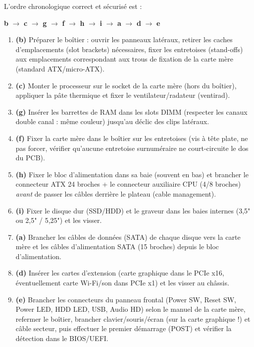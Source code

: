 \documentclass[11pt]{article}
\begin{document}
\begin{corrige}
L'ordre chronologique correct et sécurisé est :
\begin{center}
\textbf{b} $\rightarrow$ \textbf{c} $\rightarrow$ \textbf{g} $\rightarrow$ \textbf{f} $\rightarrow$ \textbf{h} $\rightarrow$ \textbf{i} $\rightarrow$ \textbf{a} $\rightarrow$ \textbf{d} $\rightarrow$ \textbf{e}
\end{center}
\begin{enumerate}
  \item \textbf{(b)} Préparer le boîtier : ouvrir les panneaux latéraux, retirer les caches d'emplacements (slot brackets) nécessaires, fixer les entretoises (stand-offs) aux emplacements correspondant aux trous de fixation de la carte mère (standard ATX/micro-ATX).
  \item \textbf{(c)} Monter le processeur sur le socket de la carte mère (hors du boîtier), appliquer la pâte thermique et fixer le ventilateur/radateur (ventirad).
  \item \textbf{(g)} Insérer les barrettes de RAM dans les slots DIMM (respecter les canaux double canal : même couleur) jusqu'au déclic des clips latéraux.
  \item \textbf{(f)} Fixer la carte mère dans le boîtier sur les entretoises (vis à tête plate, ne pas forcer, vérifier qu'aucune entretoise surnuméraire ne court-circuite le dos du PCB).
  \item \textbf{(h)} Fixer le bloc d'alimentation dans sa baie (souvent en bas) et brancher le connecteur ATX 24 broches + le connecteur auxiliaire CPU (4/8 broches) \emph{avant} de passer les câbles derrière le plateau (cable management).
  \item \textbf{(i)} Fixer le disque dur (SSD/HDD) et le graveur dans les baies internes (3,5" ou 2,5" / 5,25") et les visser.
  \item \textbf{(a)} Brancher les câbles de données (SATA) de chaque disque vers la carte mère et les câbles d'alimentation SATA (15 broches) depuis le bloc d'alimentation.
  \item \textbf{(d)} Insérer les cartes d'extension (carte graphique dans le PCIe x16, éventuellement carte Wi-Fi/son dans PCIe x1) et les visser au châssis.
  \item \textbf{(e)} Brancher les connecteurs du panneau frontal (Power SW, Reset SW, Power LED, HDD LED, USB, Audio HD) selon le manuel de la carte mère, refermer le boîtier, brancher clavier/souris/écran (sur la carte graphique !) et câble secteur, puis effectuer le premier démarrage (POST) et vérifier la détection dans le BIOS/UEFI.

\end{enumerate}
\end{corrige}
\end{document}
